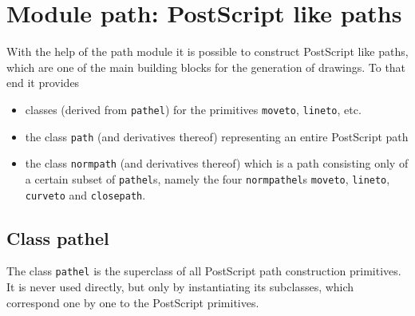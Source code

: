\chapter{Module path: PostScript like paths}

\label{path}

With the help of the path module it is possible to construct PostScript like 
paths, which are one of the main building blocks for the generation of 
drawings. To that end it provides 
\begin{itemize}
\item classes (derived from \verb|pathel|) for the primitives \verb|moveto|, \verb|lineto|, etc.
\item the class \verb|path| (and derivatives thereof) representing an
  entire PostScript path
\item the class \verb|normpath| (and derivatives thereof) which is a
  path consisting only of a certain subset of \verb|pathel|s, namely
  the four \verb|normpathel|s \verb|moveto|, \verb|lineto|,
  \verb|curveto| and \verb|closepath|.
\end{itemize}

\section{Class pathel}

The class \verb|pathel| is the superclass of all PostScript path
construction primitives. It is never used directly, but only by
instantiating its subclasses, which correspond one by one to the
PostScript primitives.

